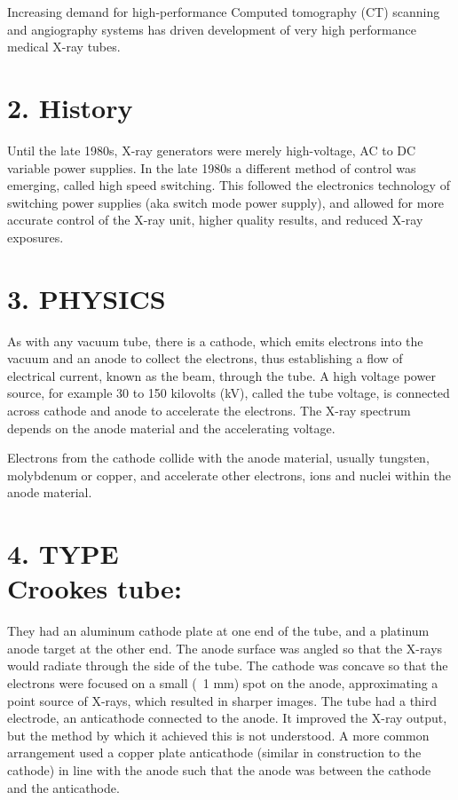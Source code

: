 \documentclass[12pt]{article}
\begin{document}
Increasing demand for high-performance Computed tomography (CT) scanning and angiography systems has driven development of very high performance medical X-ray tubes.

\section*{2. History }
Until the late 1980s, X-ray generators were merely high-voltage, AC to DC variable power supplies. In the late 1980s a different method of control was emerging, called high speed switching. This followed the electronics technology of switching power supplies (aka switch mode power supply), and allowed for more accurate control of the X-ray unit, higher quality results, and reduced X-ray exposures.

\section*{3. PHYSICS}
As with any vacuum tube, there is a cathode, which emits electrons into the vacuum and an anode to collect the electrons, thus establishing a flow of electrical current, known as the beam, through the tube. A high voltage power source, for example 30 to 150 kilovolts (kV), called the tube voltage, is connected across cathode and anode to accelerate the electrons. The X-ray spectrum depends on the anode material and the accelerating voltage.

Electrons from the cathode collide with the anode material, usually tungsten, molybdenum or copper, and accelerate other electrons, ions and nuclei within the anode material. 


\section*{4. TYPE\\Crookes tube:}
They had an aluminum cathode plate at one end of the tube, and a platinum anode target at the other end. The anode surface was angled so that the X-rays would radiate through the side of the tube. The cathode was concave so that the electrons were focused on a small (~1 mm) spot on the anode, approximating a point source of X-rays, which resulted in sharper images. The tube had a third electrode, an anticathode connected to the anode. It improved the X-ray output, but the method by which it achieved this is not understood. A more common arrangement used a copper plate anticathode (similar in construction to the cathode) in line with the anode such that the anode was between the cathode and the anticathode.
\end{document}
